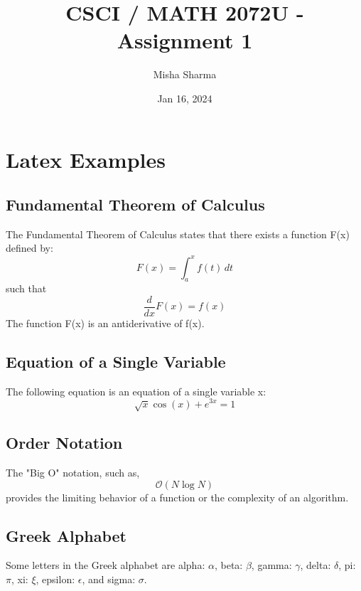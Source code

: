 \documentclass{article}
\title{CSCI / MATH 2072U - Assignment 1}
\author{Misha Sharma}         %
\date{Jan 16, 2024}           %
\begin{document}
\maketitle

\section{Latex Examples}

\subsection{\textbf{Fundamental Theorem of Calculus}}
The Fundamental Theorem of Calculus states that there exists a function F(x) defined by:
\begin{equation*}
  F(x) = \int_{a}^{x} f(t) \, dt
\end{equation*}
such that
\begin{equation*}
\frac{d}{dx}F(x) = f(x)
\end{equation*}
The function F(x) is an antiderivative of f(x).

\subsection{\textbf{Equation of a Single Variable}}
The following equation is an equation of a single variable x:
\begin{equation*}
\sqrt{x} \cos(x) + e^{3x} = 1
\end{equation*}
  
 \subsection{\textbf{Order Notation}}
The "Big O" notation, such as,
\begin{equation*}
\mathcal{O}(N \log N)
\end{equation*}
provides the limiting behavior of a function or the complexity of an algorithm.

\subsection{Greek Alphabet}
 
Some letters in the Greek alphabet are alpha: $\alpha$, beta: $\beta$, gamma: $\gamma$, delta: $\delta$, pi: $\pi$, xi: $\xi$, epsilon: $\epsilon$, and sigma: $\sigma$.
\end{document}

